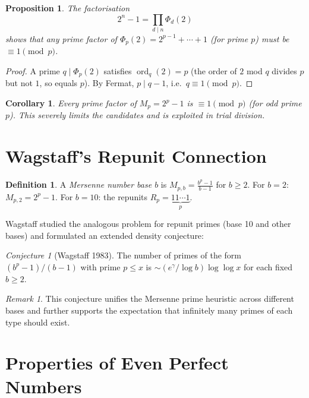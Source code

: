 \documentclass[12pt,a4paper]{amsart}
\newtheorem{corollary}[theorem]{Corollary}
\newtheorem{proposition}[theorem]{Proposition}
\theoremstyle{definition}
\newtheorem{definition}[theorem]{Definition}
\theoremstyle{remark}
\newtheorem{remark}[theorem]{Remark}
\newtheorem{conjecture}[theorem]{Conjecture}
\DeclareMathOperator{\ord}{ord}
\begin{document}
\begin{proposition}
The factorisation
\[
  2^n - 1 = \prod_{d \mid n} \Phi_d(2)
\]
shows that any prime factor of $\Phi_p(2) = 2^{p-1} + \cdots + 1$ (for prime $p$)
must be $\equiv 1 \pmod{p}$.
\end{proposition}

\begin{proof}
A prime $q \mid \Phi_p(2)$ satisfies $\ord_q(2) = p$ (the order of $2$ mod $q$
divides $p$ but not $1$, so equals $p$). By Fermat, $p \mid q-1$, i.e.\
$q \equiv 1 \pmod{p}$.
\end{proof}

\begin{corollary}
Every prime factor of $M_p = 2^p - 1$ is $\equiv 1 \pmod{p}$
(for odd prime $p$).
This severely limits the candidates and is exploited in trial division.
\end{corollary}

\section{Wagstaff's Repunit Connection}

\begin{definition}
A \emph{Mersenne number base $b$} is $M_{p,b} = \frac{b^p - 1}{b - 1}$
for $b \geq 2$.
For $b = 2$: $M_{p,2} = 2^p - 1$.
For $b = 10$: the repunits $R_p = \underbrace{11\cdots1}_p$.
\end{definition}

Wagstaff studied the analogous problem for repunit primes (base 10 and other
bases) and formulated an extended density conjecture:

\begin{conjecture}[Wagstaff 1983]
The number of primes of the form $(b^p - 1)/(b-1)$ with prime $p \leq x$
is $\sim (e^\gamma / \log b) \log\log x$ for each fixed $b \geq 2$.
\end{conjecture}

\begin{remark}
This conjecture unifies the Mersenne prime heuristic across different bases
and further supports the expectation that infinitely many primes of each type
should exist.
\end{remark}

\section{Properties of Even Perfect Numbers}
\end{document}
